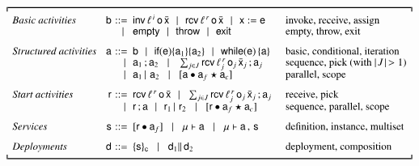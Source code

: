 \begin{table}[t]
\begin{small}
$$
\delimite{
\begin{array}{
@{\hspace{-1ex}}l@{\hspace{2ex}}r@{\hspace{.75ex}}l@{\!}l@{\hspace{3ex}}l@{\hspace{-1ex}}}
\textit{Basic activities} & \xa & ::= &
\xinv{\plinv}{\xo}{\bar{\xx}} \!\sepgr\!
\xrec{\plrec}{\xo}{\bar{\xx}} \!\sepgr\!
\xass{\xx}{\xe} & \textrm{invoke, receive, assign}\\[-.05cm]
 &  & \!\sepgr\! &
\xskip \!\sepgr\!
\xthr \!\sepgr\!
\xexit & \textrm{empty, throw, exit}\\[0.25cm]
%
\textit{Structured activities} & \xs & ::= &
\xa \!\sepgr\!
\xif{\xe}{\xs_1}{\xs_2} \!\sepgr\!
\xwhile{\xe}{\xs} & \textrm{basic, conditional, iteration}\\[-.05cm]
& & \sepgr & \xs_1\xsucc\xs_2 \sepgr
\sum_{j \in J}\xrec{\plrec_j}{\xo_j}{\bar{\xx}_j}\recsep\xs_j &
\textrm{sequence, pick (with $\length{J} \,> 1$)}\\[-.05cm] & & \sepgr & \xs_1
\xpar\, \xs_2 \sepgr \xscopefc{\xs}{\xh_f}{\xh_c} & \textrm{parallel, scope}
\\[0.25cm]
%
\textit{Start activities} & \xsa & ::= &
\xrec{\plrec}{\xo}{\bar{\xx}} \!\sepgr\!
\sum_{j\in J}\xrec{\plrec_j}{\xo_j}{\bar{\xx}_j}\recsep\xs_j & \textrm{receive,
pick}\\[-.05cm] & & \sepgr & \xsa \xsucc \xs \!\sepgr\! \xsa_1 \xpar\, \xsa_2
\sepgr \xscopefc{\xsa}{\xh_f}{\xh_c} & \textrm{sequence, parallel,
scope}\\[0.25cm]
%
\textit{Services} & \xI & ::= &
\xproc{\xsa}{\xh_f} \sepgr
\xinst{\xsigma}{\xs} \sepgr
\xinst{\xsigma}{\xs} \xmid \xI & \textrm{definition, instance,
multiset}\\[0.25cm]
%
\textit{Deployments} & \xd & ::= &
\xeng{\xI}{\xcorr} \sepgr
\xd_1 \xspar \xd_2 &  \textrm{deployment, composition}
\end{array}
}
$$
\end{small}
  \vspace*{-1.20cm}
  \caption{La sintassi di Blite}
  \label{tab:syntaxwsbpel}
  \vspace*{-0.3cm}
\end{table}

